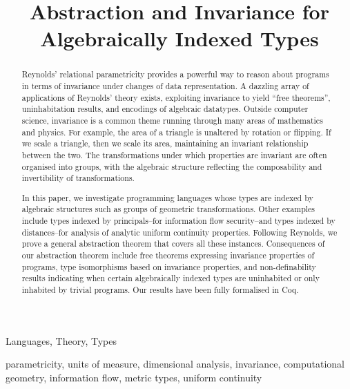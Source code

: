 \documentclass[preprint]{sigplanconf}
\title{Abstraction and Invariance for Algebraically Indexed Types}
\theoremstyle{examplestyle}
\theoremstyle{restatementstyle}
\begin{document}
\maketitle

\begin{abstract}
  Reynolds' relational parametricity provides a powerful way to reason
  about programs in terms of invariance under changes of data
  representation. A dazzling array of applications of Reynolds' theory
  exists, exploiting invariance to yield ``free theorems'',
  uninhabitation results, and encodings of algebraic datatypes.
  Outside computer science, invariance is a common theme running
  through many areas of mathematics and physics. For example, the area of
  a triangle is unaltered by rotation or flipping. If we scale a
  triangle, then we scale its area, maintaining an invariant
  relationship between the two. The transformations under which
  properties are invariant are often organised into groups, with the
  algebraic structure reflecting the composability and invertibility
  of transformations.

  In this paper, we investigate programming languages whose types are
  indexed by algebraic structures such as groups of geometric
  transformations. Other examples include types indexed by
  principals--for information flow security--and types indexed by
  distances--for analysis of analytic uniform continuity
  properties. Following Reynolds, we prove a general abstraction
  theorem that covers all these instances. Consequences of our
  abstraction theorem include free theorems expressing invariance
  properties of programs, type isomorphisms based on invariance
  properties, and non-definability results indicating when certain
  algebraically indexed types are uninhabited or only inhabited by
  trivial programs.  Our results have been fully formalised in Coq.
\end{abstract}

  

\terms
  Languages, Theory, Types

\keywords parametricity, units of measure, dimensional analysis,
invariance, computational geometry, information flow, metric types, uniform continuity







%


\end{document}
